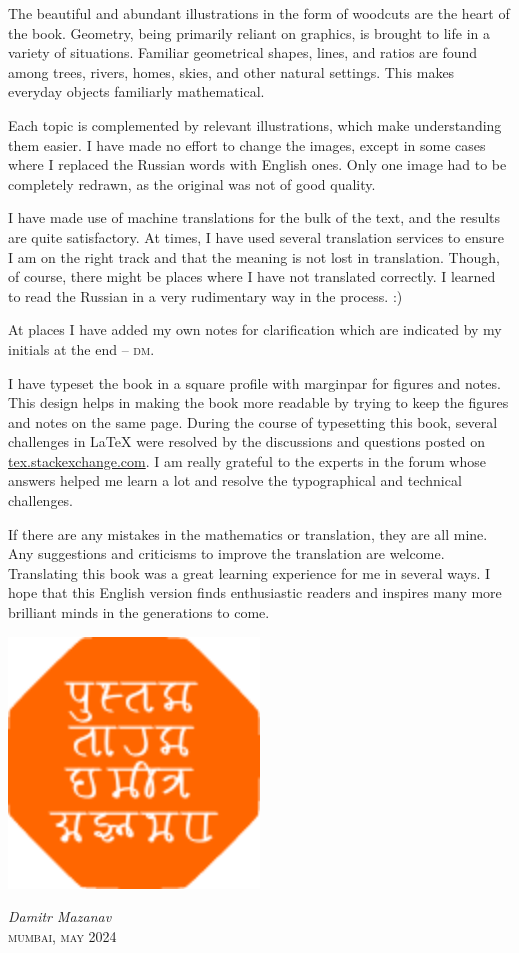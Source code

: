 The beautiful and abundant illustrations in the form of woodcuts are the heart of the book. Geometry, being primarily reliant on graphics, is brought to life in a variety of situations. Familiar geometrical shapes, lines, and ratios are found among trees, rivers, homes, skies, and other natural settings. This makes everyday objects familiarly mathematical.

Each topic is complemented by relevant illustrations, which make understanding them easier. I have made no effort to change the images, except in some cases where I replaced the Russian words with English ones. Only one image had to be completely redrawn, as the original was not of good quality.

I have made use of machine translations for the bulk of the text, and the results are quite satisfactory. At times, I have used several translation services to ensure I am on the right track and that the meaning is not lost in translation. Though, of course, there might be places where I have not translated correctly. I learned to read the Russian in a very rudimentary way in the process. :)

At places I have added my own notes for clarification which are indicated by my initials at the end -- \textsc{dm}.

I have typeset the book in a square profile with marginpar for figures and notes. This design helps in making the book more readable by trying to keep the figures and notes on the same page. During the course of typesetting this book, several challenges in \LaTeX{} were resolved by the discussions and questions posted on \url{tex.stackexchange.com}. I am really grateful to the experts in the forum whose answers helped me learn a lot and resolve the typographical and technical challenges.

If there are any mistakes in the mathematics or translation, they are all mine. Any suggestions and criticisms to improve the translation are welcome. Translating this book was a great learning experience for me in several ways. I hope that this English version finds enthusiastic readers and inspires many more brilliant minds in the generations to come.

\begin{marginfigure}
\includegraphics[width=0.5\textwidth]{figures/pustaktarak.pdf}
\end{marginfigure}
\begin{flushright}
\emph{Damitr Mazanav}\\
\textsc{mumbai, may 2024}
\end{flushright}

\clearpage